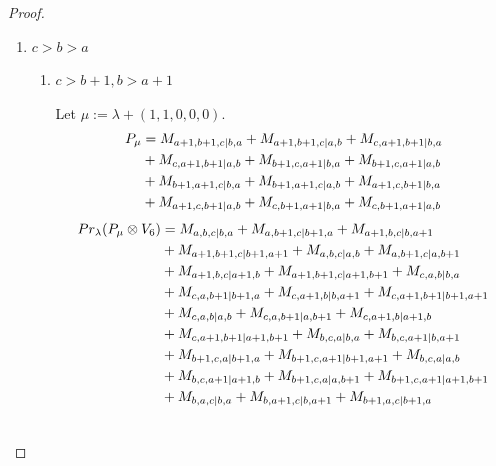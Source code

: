 \begin{proof}
\begin{enumerate}
    \item $c>b>a$
      \begin{enumerate}
        \item $c>b+1,b>a+1$ \par
        Let $\mu:=\lambda + (1,1,0,0,0) $.
        \begin{equation}\notag
          \begin{aligned}
            P_\mu &= M_{a+1,b+1,c|b,a}
+ M_{a+1,b+1,c|a,b}
+ M_{c,a+1,b+1|b,a}\\
                                              &
+ M_{c,a+1,b+1|a,b}
+ M_{b+1,c,a+1|b,a}
+ M_{b+1,c,a+1|a,b}\\
                                              &
+ M_{b+1,a+1,c|b,a}
+ M_{b+1,a+1,c|a,b}
+ M_{a+1,c,b+1|b,a}\\
                                              &
+ M_{a+1,c,b+1|a,b}
+ M_{c,b+1,a+1|b,a}
+ M_{c,b+1,a+1|a,b}
          \end{aligned}
        \end{equation}
        \begin{equation}\notag
          \begin{aligned}
            Pr_{\lambda}(P_\mu \otimes V_{6}) &=
M_{a,b,c|b,a}
+ M_{a,b+1,c|b+1,a}
+ M_{a+1,b,c|b,a+1}\\
                                              &
+ M_{a+1,b+1,c|b+1,a+1}
+ M_{a,b,c|a,b}
+ M_{a,b+1,c|a,b+1}\\
                                              &
+ M_{a+1,b,c|a+1,b}
+ M_{a+1,b+1,c|a+1,b+1}
+ M_{c,a,b|b,a}\\
                                              &
+ M_{c,a,b+1|b+1,a}
+ M_{c,a+1,b|b,a+1}
+ M_{c,a+1,b+1|b+1,a+1}\\
                                              &
+ M_{c,a,b|a,b}
+ M_{c,a,b+1|a,b+1}
+ M_{c,a+1,b|a+1,b}\\
                                              &
+ M_{c,a+1,b+1|a+1,b+1}
+ M_{b,c,a|b,a}
+ M_{b,c,a+1|b,a+1}\\
                                              &
+ M_{b+1,c,a|b+1,a}
+ M_{b+1,c,a+1|b+1,a+1}
+ M_{b,c,a|a,b}\\
                                              &
+ M_{b,c,a+1|a+1,b}
+ M_{b+1,c,a|a,b+1}
+ M_{b+1,c,a+1|a+1,b+1}\\
                                              &
+ M_{b,a,c|b,a}
+ M_{b,a+1,c|b,a+1}
+ M_{b+1,a,c|b+1,a}\\
                                              &

\end{aligned}
\end{equation}
\end{enumerate}
\end{enumerate}
\end{proof}
